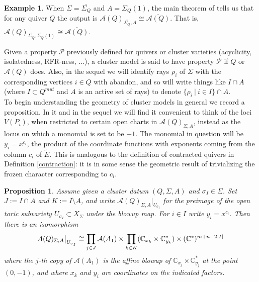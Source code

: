 \documentclass[11pt]{amsart}
\newtheorem{prop}[thm]{Proposition}
\theoremstyle{definition}
\newtheorem{exmp}[thm]{Example}
\theoremstyle{remark}
\newcommand{\A}{\mathcal{A}}
\numberwithin{equation}{section}
\begin{document}
\begin{exmp}
    When $\Sigma = \overline{\Sigma_Q}$ and $A = \Sigma_Q(1)$, the main theorem of \cite{GHK} tells us that for any quiver $Q$ the output is $\mathcal{A}(Q)_{\overline{\Sigma_Q}, A} \cong \overline{\mathcal{A}(Q)}$. That is, $\mathcal{A}(Q)_{\overline{\Sigma_Q}, \overline{\Sigma_Q}(1)} \cong \overline{\mathcal{A}(Q)}$.
\end{exmp}

Given a property $\mathcal{P}$ previously defined for quivers or cluster varieties (acyclicity, isolatedness, RFR-ness, ...), a cluster model is said to have property $\mathcal{P}$ if $Q$ or $\mathcal{A}(Q)$ does. Also, in the sequel we will identify rays $\rho_i$ of $\Sigma$ with the corresponding vertices $i \in Q$ with abandon, and so will write things like $I \cap A$ (where $I \subset Q^{mut}$ and $A$ is an active set of rays) to denote $\{\rho_i\:|\: i \in I\} \cap A$.\\

To begin understanding the geometry of cluster models in general we record a proposition. In it and in the sequel we will find it convenient to think of the loci $V(P_i)$, when restricted to certain open charts in $\mathcal{A}(Q)_{\Sigma, A}$, instead as the locus on which a monomial is set to be $-1$. The monomial in question will be $y_i = x^{c_i}$, the product of the coordinate functions with exponents coming from the column $c_i$ of $\tilde{E}$. This is analogous to the definition of contracted quivers in Definition \ref{contraction}: it is in some sense the geometric result of trivializing the frozen character corresponding to $c_i$.

\begin{prop}\label{chart lemma}
    Assume given a cluster datum $(Q, \Sigma, A)$ and $\sigma_I \in \Sigma$. Set $J := I \cap A$ and $K := I \setminus A$, and write $\mathcal{A}(Q)_{\Sigma, A}|_{U_{\sigma_I}}$ for the preimage of the open toric subvariety $U_{\sigma_I} \subset X_\Sigma$ under the blowup map. For $i \in I$ write $y_i = x^{c_i}$. Then there is an isomorphism $$\mathcal \A(Q)_{\Sigma,A}\big|_{U_{\sigma_I}} \cong \prod_{j \in J} \mathcal A(A_1) \times \prod_{k \in K} (\mathbb C_{x_k} \times \mathbb{C}_{y_k}^*)\times (\mathbb C^*)^{m+n-2|I|}$$ \noindent where the $j$-th copy of $\mathcal{A}(A_1)$ is the affine blowup of $\mathbb{C}_{x_j} \times \mathbb{C}^*_{y_j}$ at the point $(0, -1)$, and where $x_k$ and $y_i$ are coordinates on the indicated factors.
\end{prop}
\end{document}
